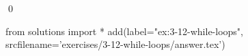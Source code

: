 
\begin{ex}
  \label{ex:3-12-while-loops}
  
  \qed
\end{ex}
\begin{python0}
from solutions import *
add(label="ex:3-12-while-loops",
    srcfilename='exercises/3-12-while-loops/answer.tex')
\end{python0}
